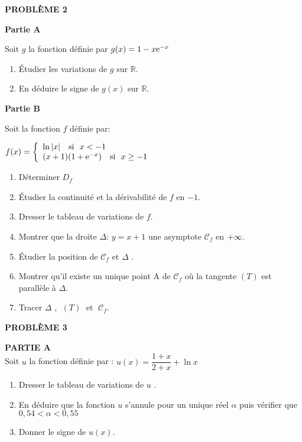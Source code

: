 \begin{enumerate}
\begin{enumerate}
\end{enumerate}

\vspace{0,5cm}

\textbf{PROBLÈME 2}


\textbf{Partie A}
\medskip


Soit $ g $ la fonction définie par $ g(x)=1-x\mathrm{e}^{-x} $
 \begin{enumerate}
\item Étudier les variations de $ g $ sur $ \mathbb{R} $.
 \item En déduire le signe de $ g(x) $ sur $ \mathbb{R} $.
\end{enumerate}


\medskip
\textbf{Partie B}


\medskip
Soit la fonction $ f $ définie par: 


\medskip
   $f(x)=\left \{\begin{array}{l} \ln|x|~~~ \textrm{si}~~ x< -1 ~\\ (x+1)(1+\mathrm{e}^{-x})~~~ \textrm{si}~~ x\geq -1 \end{array}\right.$

\begin{enumerate}
\item Déterminer $ D_{f} $
\item Étudier la continuité et  la dérivabilité de $ f $  en $ -1 $. 
\item Dresser le tableau de variations de $ f $.
\item  Montrer que la droite $ \Delta $: $ y=x+1$  une asymptote  $\mathscr{C}_{f}$  en $ +\infty $.
\item  Étudier la position de  $\mathscr{C}_{f}$ et $ \Delta $ .
\item Montrer qu'il existe un unique point A  de  $\mathscr{C}_{f}$ où la tangente  $ (T) $ est parallèle à   $ \Delta $. 
\item Tracer $ \Delta $ , $\; (T) \;$   et   $\;\mathscr{C}_{f}$.

\end{enumerate}

\vspace{0,5cm}

\textbf{PROBLÈME  3}

\medskip

\textbf{PARTIE A}\\

 Soit $ u $ la fonction définie par :
  $ u(x)= \dfrac{1+x}{2+x} +\ln x  $ 
  \begin{enumerate}
 \item Dresser le tableau de  variations de $ u $ . 
 \item En déduire que la fonction $ u $ s'annule pour un unique réel $ \alpha $ puis
 vérifier  que $ 0,54 <\alpha  < 0,55 $ 
 \item Donner le signe de $ u(x) $.
 \end{enumerate}
 \bigskip
 

\end{enumerate}
